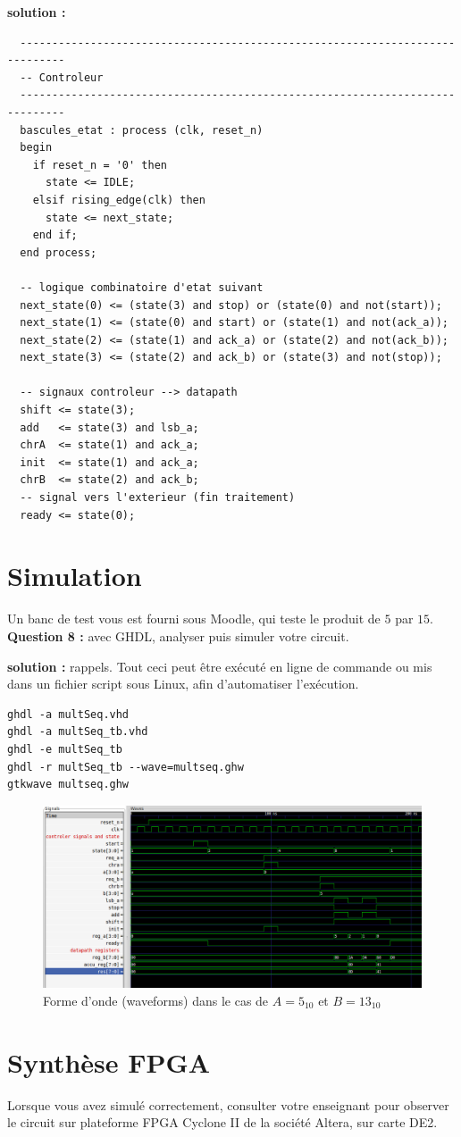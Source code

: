 \documentclass[a4paper,11pt]{article}
\begin{document}
{\bf solution :}
\begin{lstlisting}
  -----------------------------------------------------------------------------
  -- Controleur
  -----------------------------------------------------------------------------
  bascules_etat : process (clk, reset_n)
  begin
    if reset_n = '0' then
      state <= IDLE;
    elsif rising_edge(clk) then
      state <= next_state;
    end if;
  end process;

  -- logique combinatoire d'etat suivant
  next_state(0) <= (state(3) and stop) or (state(0) and not(start));
  next_state(1) <= (state(0) and start) or (state(1) and not(ack_a));
  next_state(2) <= (state(1) and ack_a) or (state(2) and not(ack_b));
  next_state(3) <= (state(2) and ack_b) or (state(3) and not(stop));

  -- signaux controleur --> datapath
  shift <= state(3);
  add   <= state(3) and lsb_a;
  chrA  <= state(1) and ack_a;
  init  <= state(1) and ack_a;
  chrB  <= state(2) and ack_b;
  -- signal vers l'exterieur (fin traitement)
  ready <= state(0);
\end{lstlisting}

\section{Simulation}

Un banc de test vous est fourni sous Moodle, qui teste le produit de $5$ par $15$.\\

{\bf Question 8 :} avec GHDL, analyser puis simuler votre circuit.

{\bf solution :} rappels. Tout ceci peut être exécuté en ligne de commande ou mis dans un fichier script sous Linux, afin d'automatiser l'exécution.
\begin{verbatim}
ghdl -a multSeq.vhd
ghdl -a multSeq_tb.vhd
ghdl -e multSeq_tb
ghdl -r multSeq_tb --wave=multseq.ghw
gtkwave multseq.ghw
\end{verbatim}

\begin{figure}[!h]
\begin{center}
\includegraphics[scale=0.4]{./figures/wave_logic.png}
\end{center}
\caption{Forme d'onde (waveforms) dans le cas de $A=5_{10}$ et $B=13_{10}$}
\end{figure}

\section{Synthèse FPGA}

Lorsque vous avez simulé correctement, consulter votre enseignant pour observer le circuit sur plateforme FPGA Cyclone II de la société Altera, sur carte DE2.
\end{document}
